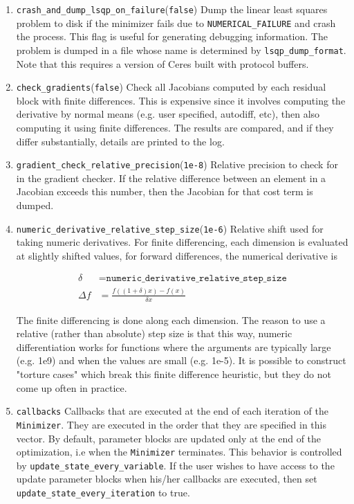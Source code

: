 \begin{enumerate}
\item{\texttt{crash\_and\_dump\_lsqp\_on\_failure}}(\texttt{false})
 Dump the linear least squares problem to disk if the minimizer
     fails due to \texttt{NUMERICAL\_FAILURE} and crash the process. This flag
     is useful for generating debugging information. The problem is
     dumped in a file whose name is determined by
   \texttt{lsqp\_dump\_format}. Note that this requires a version of Ceres built with protocol buffers.

\item{\texttt{check\_gradients}}(\texttt{false})
 Check all Jacobians computed by each residual block with finite
     differences. This is expensive since it involves computing the
     derivative by normal means (e.g. user specified, autodiff,
     etc), then also computing it using finite differences. The
     results are compared, and if they differ substantially, details
     are printed to the log.

\item{\texttt{gradient\_check\_relative\_precision}}(\texttt{1e-8})
  Relative precision to check for in the gradient checker. If the
  relative difference between an element in a Jacobian exceeds
  this number, then the Jacobian for that cost term is dumped.

\item{\texttt{numeric\_derivative\_relative\_step\_size}}(\texttt{1e-6})
 Relative shift used for taking numeric derivatives. For finite
     differencing, each dimension is evaluated at slightly shifted
     values, \eg for forward differences, the numerical derivative is
  
\begin{align}
       \delta &= \texttt{numeric\_derivative\_relative\_step\_size}\\
       \Delta f &= \frac{f((1 + \delta)  x) - f(x)}{\delta x}
\end{align} 


     The finite differencing is done along each dimension. The
     reason to use a relative (rather than absolute) step size is
     that this way, numeric differentiation works for functions where
     the arguments are typically large (e.g. 1e9) and when the
     values are small (e.g. 1e-5). It is possible to construct
     "torture cases" which break this finite difference heuristic,
     but they do not come up often in practice.

\item{\texttt{callbacks}} 
  Callbacks that are executed at the end of each iteration of the
     \texttt{Minimizer}. They are executed in the order that they are
     specified in this vector. By default, parameter blocks are
     updated only at the end of the optimization, i.e when the
     \texttt{Minimizer} terminates. This behavior is controlled by
     \texttt{update\_state\_every\_variable}. If the user wishes to have access
     to the update parameter blocks when his/her callbacks are
     executed, then set \texttt{update\_state\_every\_iteration} to true.
    

\end{enumerate}
